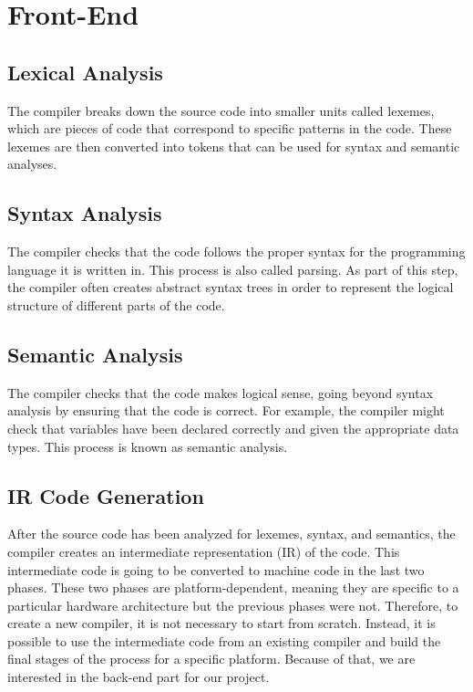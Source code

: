 \section{Front-End}

\subsection{Lexical Analysis}
The compiler breaks down the source code into smaller units called lexemes, which are pieces of code that correspond to specific patterns in the code. These lexemes are then converted into tokens that can be used for syntax and semantic analyses.

\subsection{Syntax Analysis}
The compiler checks that the code follows the proper syntax for the programming language it is written in. This process is also called parsing. As part of this step, the compiler often creates abstract syntax trees in order to represent the logical structure of different parts of the code.

\subsection{Semantic Analysis}
The compiler checks that the code makes logical sense, going beyond syntax analysis by ensuring that the code is correct. For example, the compiler might check that variables have been declared correctly and given the appropriate data types. This process is known as semantic analysis.

\subsection{IR Code Generation}
After the source code has been analyzed for lexemes, syntax, and semantics, the compiler creates an intermediate representation (IR) of the code.
This intermediate code is going to be converted to machine code in the last two phases. These two phases are platform-dependent, meaning they are specific to a particular hardware architecture but the previous phases were not. Therefore, to create a new compiler, it is not necessary to start from scratch. Instead, it is possible to use the intermediate code from an existing compiler and build the final stages of the process for a specific platform. Because of that, we are interested in the back-end part for our project.

